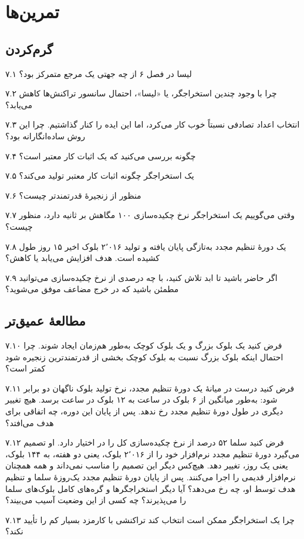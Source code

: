 \documentclass[oneside,a4paper,12pt]{book}
\newcommand{\پاورقی}[2]{%
  \footnote{%
    \scriptsize
    \setlength{\parindent}{0pt}%
    \setlength{\parskip}{0pt}%
    \lr{#1} -- معادل فارسی: #2%
  }}
\newcommand{\قاب}[3][]{%
  \begin{center}
  \fbox{\begin{minipage}{0.78\textwidth}
  \begin{flushright}
  \textbf{#2}\par\smallskip
  #3
  \end{flushright}
  \end{minipage}}
  \end{center}}
\begin{document}
\section{تمرین‌ها}
\subsection{گرم‌کردن}
۷.۱ لیسا در فصل ۶ از چه جهتی یک مرجع متمرکز بود؟

۷.۲ چرا با وجود چندین استخراجگر، یا «لیسا»، احتمال سانسور تراکنش‌ها کاهش می‌یابد؟

۷.۳ انتخاب اعداد تصادفی نسبتاً خوب کار می‌کرد، اما این ایده را کنار گذاشتیم. چرا این روش ساده‌انگارانه بود؟

۷.۴ چگونه بررسی می‌کنید که یک اثبات کار معتبر است؟

۷.۵ یک استخراجگر چگونه اثبات کار معتبر تولید می‌کند؟

۷.۶ منظور از زنجیرهٔ قدرتمندتر چیست؟

۷.۷ وقتی می‌گوییم یک استخراجگر نرخ چکیده‌سازی ۱۰۰ مگاهش بر ثانیه دارد، منظور چیست؟

۷.۸ یک دورهٔ تنظیم مجدد به‌تازگی پایان یافته و تولید ۲٬۰۱۶ بلوک اخیر ۱۵ روز طول کشیده است. هدف افزایش می‌یابد یا کاهش؟

۷.۹ اگر حاضر باشید تا ابد تلاش کنید، با چه درصدی از نرخ چکیده‌سازی می‌توانید مطمئن باشید که در خرج مضاعف موفق می‌شوید؟

\subsection{مطالعهٔ عمیق‌تر}
۷.۱۰ فرض کنید یک بلوک بزرگ و یک بلوک کوچک به‌طور هم‌زمان ایجاد شوند. چرا احتمال اینکه بلوک بزرگ نسبت به بلوک کوچک بخشی از قدرتمندترین زنجیره شود کمتر است؟

۷.۱۱ فرض کنید درست در میانهٔ یک دورهٔ تنظیم مجدد، نرخ تولید بلوک ناگهان دو برابر شود: به‌طور میانگین از ۶ بلوک در ساعت به ۱۲ بلوک در ساعت برسد. هیچ تغییر دیگری در طول دورهٔ تنظیم مجدد رخ ندهد. پس از پایان این دوره، چه اتفاقی برای هدف می‌افتد؟

۷.۱۲ فرض کنید سلما ۵۲ درصد از نرخ چکیده‌سازی کل را در اختیار دارد. او تصمیم می‌گیرد دورهٔ تنظیم مجدد نرم‌افزار خود را از ۲٬۰۱۶ بلوک، یعنی دو هفته، به ۱۴۴ بلوک، یعنی یک روز، تغییر دهد. هیچ‌کس دیگر این تصمیم را مناسب نمی‌داند و همه همچنان نرم‌افزار قدیمی را اجرا می‌کنند. پس از پایان دورهٔ تنظیم مجدد یک‌روزهٔ سلما و تنظیم هدف توسط او، چه رخ می‌دهد؟ آیا دیگر استخراجگرها و گره‌های کامل بلوک‌های سلما را می‌پذیرند؟ چه کسی از این وضعیت آسیب می‌بیند؟

۷.۱۳ چرا یک استخراجگر ممکن است انتخاب کند تراکنشی با کارمزد بسیار کم را تأیید نکند؟
\end{document}
